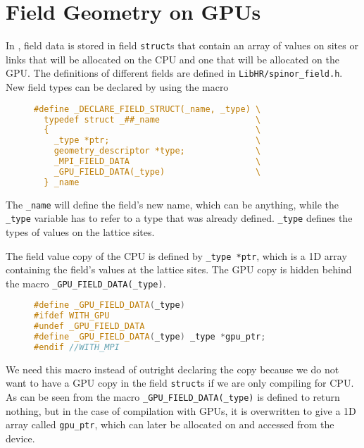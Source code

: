\documentclass[12pt]{article}
\begin{document}
\section*{Field Geometry on GPUs}
In , field data is stored in field \texttt{struct}s that contain an array of values on sites or links that will be allocated on the CPU and one that will be allocated on the GPU. The definitions of different fields are defined in \texttt{LibHR/spinor\_field.h}. New field types can be declared by using the macro

\begin{figure}[H]
\begin{lstlisting}[caption=from spinor\_field.h,language=C]
#define _DECLARE_FIELD_STRUCT(_name, _type) \
  typedef struct _##_name                   \
  {                                         \
    _type *ptr;                             \
    geometry_descriptor *type;              \
    _MPI_FIELD_DATA                         \
    _GPU_FIELD_DATA(_type)                  \
  } _name
\end{lstlisting}
\end{figure}

The \texttt{\_name} will define the field's new name, which can be anything, while the \texttt{\_type} variable has to refer to a type that was already defined. \texttt{\_type} defines the types of values on the lattice sites.\par
The field value copy of the CPU is defined by \texttt{\_type *ptr}, which is a 1D array containing the field's values at the lattice sites. The GPU copy is hidden behind the macro \texttt{\_GPU\_FIELD\_DATA(\_type)}.

\begin{figure}[H]
\begin{lstlisting}[caption=from spinor\_field.h,language=C++]
#define _GPU_FIELD_DATA(_type)
#ifdef WITH_GPU
#undef _GPU_FIELD_DATA
#define _GPU_FIELD_DATA(_type) _type *gpu_ptr;
#endif //WITH_MPI
\end{lstlisting}
\end{figure}

We need this macro instead of outright declaring the copy because we do not want to have a GPU copy in the field \texttt{struct}s if we are only compiling for CPU. As can be seen from the macro \texttt{\_GPU\_FIELD\_DATA(\_type)} is defined to return nothing, but in the case of compilation with GPUs, it is overwritten to give a 1D array called \texttt{gpu\_ptr}, which can later be allocated on and accessed from the device.\par
\end{document}
